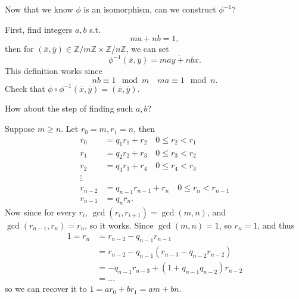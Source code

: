 \begin{question}
    Now that we know \(\phi \) is an isomorphism, can we construct \(\phi ^{-1}\)?  
\end{question}
\begin{answer}
    First, find integers \(a, b\) s.t. 
    \[
        ma + nb = 1,
    \] then for \(\left( \overline{x}, \overline{y}   \right) \in \mathbb{Z} / m\mathbb{Z} \times \mathbb{Z} / n \mathbb{Z} \), we can set 
    \[
        \phi ^{-1} \left( \overline{x}, \overline{y}   \right) = \overline{may + nbx}.  
    \] This definition works since 
    \[
        nb \equiv 1 \mod{m} \quad ma \equiv 1 \mod{n}.
    \]
    Check that \(\phi \circ \phi ^{-1} \left( \overline{x}, \overline{y}   \right) = \left( \overline{x}, \overline{y}   \right)  \). 
\end{answer}

\begin{question}
    How about the step of finding such \(a, b\)? 
\end{question}
\begin{answer}
    Suppose \(m \ge n\). Let \(r_0 = m, r_1 = n\), then 
    \begin{align*}
        r_0 &= q_1 r_1 + r_2 \quad 0 \le r_2 < r_1 \\
        r_1 &= q_2 r_2 + r_3 \quad 0 \le r_3 < r_2 \\
        r_2 &= q_3 r_3 + r_4 \quad 0 \le r_4 < r_3 \\
        \vdots \\
        r_{n - 2} &= q_{n - 1} r_{n - 1} + r_n \quad 0 \le r_n < r_{n - 1} \\
        r_{n-1} &= q_n r_n.
    \end{align*} 
    Now since for every \(r_i\), \(\gcd(r_i, r_{i+1}) = \gcd(m, n)\), and \(\gcd(r_{n-1}, r_n) = r_n\), so it works. Since \(\gcd(m, n) = 1\), so \(r_n = 1\), and thus 
    \begin{align*}
        1 = r_n &= r_{n - 2} - q_{n-1} r_{n-1} \\
        &= r_{n-2} - q_{n-1} \left( r_{n-3} - q_{n-2} r_{n-2} \right) \\
        &= -q_{n-1} r_{n-3} + (1 + q_{n-1} q_{n-2}) r_{n-2} \\
        &= \dots 
    \end{align*} 
    so we can recover it to \(1 = a r_0 + b r_1 = am + bn\).      
\end{answer}